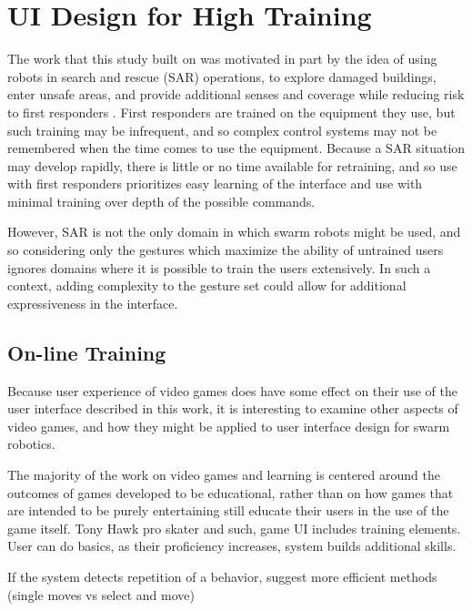 \chapter{UI Design for High Training}
\thispagestyle{fancy}

The work that this study built on was motivated in part by the idea of using robots in search and rescue (SAR) operations, to explore damaged buildings, enter unsafe areas, and provide additional senses and coverage while reducing risk to first responders \citep{micire2010multi}.
First responders are trained on the equipment they use, but such training may be infrequent, and so complex control systems may not be remembered when the time comes to use the equipment. 
Because a SAR situation may develop rapidly, there is little or no time available for retraining, and so use with first responders prioritizes easy learning of the interface and use with minimal training over depth of the possible commands.  

However, SAR is not the only domain in which swarm robots might be used, and so considering only the gestures which maximize the ability of untrained users ignores domains where it is possible to train the users extensively. 
In such a context, adding complexity to the gesture set could allow for additional expressiveness in the interface.


\section{On-line Training}

Because user experience of video games does have some effect on their use of the user interface described in this work, it is interesting to examine other aspects of video games, and how they might be applied to user interface design for swarm robotics. 

The majority of the work on video games and learning is centered around the outcomes of games developed to be educational, rather than on how games that are intended to be purely entertaining still educate their users in the use of the game itself. 
Tony Hawk pro skater and such, game UI includes training elements. User can do basics, as their proficiency increases, system builds additional skills. 

If the system detects repetition of a behavior, suggest more efficient methods (single moves vs select and move)

